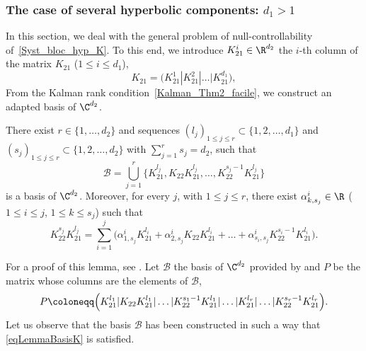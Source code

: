 \subsubsection{The case of several hyperbolic components: $d_1 >1$}
\label{SectionKd1>1}

In this section, we deal with the general problem of null-controllability of~\eqref{Syst_bloc_hyp_K}. To this end, we introduce $K_{21}^i \in \R^{d_2}$ the $i$-th column of the matrix $K_{21}$ ($1 \leq i \leq d_1$), \ie
\[
K_{21} = \bigl(K_{21}^1 | K_{21}^2 | \dots | K_{21}^{d_1} \bigr),
\]
From the Kalman rank condition~\eqref{Kalman_Thm2_facile}, we construct an adapted basis of $\C^{d_2}$.

\Changel

\begin{lemma}
\label{AdaptedBasisLemma}
There exist $r \in \{1, \dots, d_2\}$ and sequences $(l_j)_{1 \leq j \leq r} \subset \{1, 2, \dots, d_1\}$ and $(s_j)_{1 \leq j \leq r} \subset \{1, 2, \dots, d_2\}$ with $\sum_{j=1}^r s_j =d_2$, such that
\[
\mathcal{B} = \bigcup\limits_{j=1}^{r} \bigl\{K_{21}^{l_j}, K_{22} K_{21}^{l_j}, \dots, K_{22}^{s_j-1} K_{21}^{l_j} \bigr\}
\]
is a basis of $\C^{d_2}$. Moreover, for every $j$, with $1 \leq j \leq r$, there exist $\alpha_{k,s_j}^i \in \R$ ($1 \leq i \leq j$, $1 \leq k \leq s_j$) such that
\begin{equation}
K_{22}^{s_j} K_{21}^{l_j} = \sum_{i=1}^j \bigl(\alpha_{1, s_j}^i K_{21}^{l_i} + \alpha_{2, s_j}^i K_{22} K_{21}^{l_i} + \dots + \alpha_{s_i,s_j}^i K_{22}^{s_i-1} K_{21}^{l_i}\bigr).
\label{eqLemmaBasisK}
\end{equation}
\end{lemma}

For a proof of this lemma, see \cite[Lem.\,3.1]{ammarkhodja_2009a}. Let $\mathcal{B}$ the basis of $\C^{d_2}$ provided by  and $P$ be the matrix whose columns are the elements of $\mathcal{B}$, \ie
\[
P \coloneqq \Bigl(K_{21}^{l_1} | K_{22} K_{21}^{l_1} | \dots | K_{22}^{s_1-1} K_{21}^{l_1}| \dots | K_{21}^{l_r} | \dots | K_{22}^{s_r-1} K_{21}^{l_r} \Bigr).
\]
Let us observe that the basis $\mathcal{B}$ has been constructed in such a way that \eqref{eqLemmaBasisK} is satisfied.

